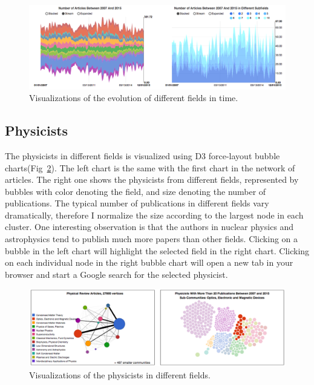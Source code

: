 \documentclass{article} %
\begin{document}
\begin{figure}[h]
  	\centering
    \includegraphics[width = 5in]{./Figures/theme_river.png}
 	\caption{Visualizations of the evolution of different fields in time.}
 	\vspace{-10pt}
  \label{fig:theme_river}
\end{figure}
 
\subsection{Physicists}
The physicists in different fields is visualized using D3 force-layout bubble charts(Fig~\ref{fig:author_whole}). The left chart is the same with the first chart in the network of articles. The right one shows the physicists from different fields, represented by bubbles with color denoting the field, and size denoting the number of publications. The typical number of publications in different fields vary dramatically, therefore I normalize the size according to the largest node in each cluster. One interesting observation is that the authors in nuclear physics and astrophysics tend to publish much more papers than other fields. Clicking on a bubble in the left chart will highlight the selected field in the right chart. Clicking on each individual node in the right bubble chart will open a new tab in your browser and start a Google search for the selected physicist.

\begin{figure}[h]
  	\centering
    \includegraphics[width = 5in]{./Figures/author_whole.png}
 	\caption{Visualizations of the physicists in different fields.}
 	\vspace{-10pt}
  \label{fig:author_whole}
\end{figure}
\end{document}
